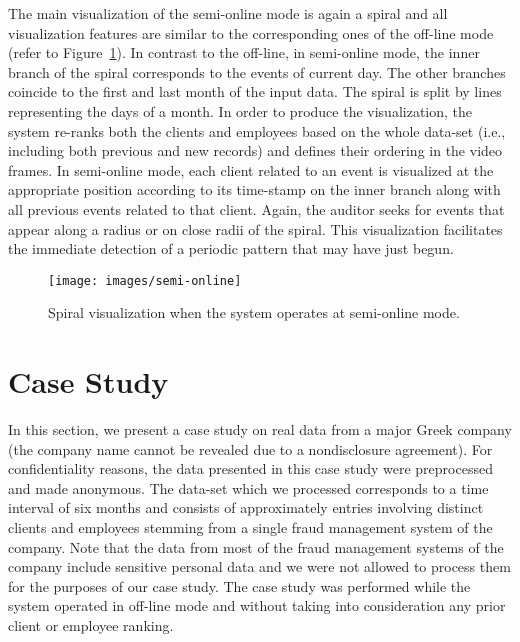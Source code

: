 \documentclass[conference]{IEEEtran}
\begin{document}
The main visualization of the semi-online mode is again a spiral and
all visualization features are similar to the corresponding ones of
the off-line mode (refer to Figure~\ref{fig:semi-online}). In
contrast to the off-line, in semi-online mode, the inner branch of
the spiral corresponds to the events of current day. The other
branches coincide to the first and last month of the input data. The
spiral is split by lines representing the days of a month. In order
to produce the visualization, the system re-ranks both the clients
and employees based on the whole data-set (i.e., including both
previous and new records) and defines their ordering in the video
frames. In semi-online mode, each client related to an event is
visualized at the appropriate position according to its time-stamp
on the inner branch along with all previous events related to that
client. Again, the auditor seeks for events that appear along a
radius or on close radii of the spiral. This visualization
facilitates the immediate detection of a periodic pattern that may
have just begun.

\begin{figure}[h!tb]
  \centering
  \texttt{[image: images/semi-online]}
  \caption{Spiral visualization when the system operates at semi-online mode.}
  \label{fig:semi-online}
\end{figure}

\section{Case Study}
\label{sec:case-study}

In this section, we present a case study on real data from a major
Greek company (the company name cannot be revealed due to a
nondisclosure agreement). For confidentiality reasons, the data
presented in this case study were preprocessed and made anonymous.
The data-set which we processed corresponds to a time interval of
six months and consists of approximately  entries involving
 distinct clients and  employees stemming from a single
fraud management system of the company. Note that the data from most
of the fraud management systems of the company include sensitive
personal data and we were not allowed to process them for the
purposes of our case study. The case study was performed while the
system operated in off-line mode and without taking into
consideration any prior client or employee ranking.
\end{document}
